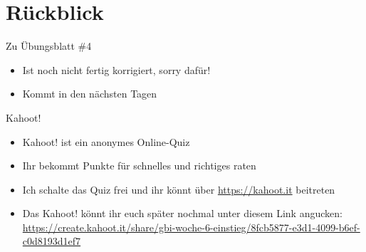 
\newcommand{\handout}{}



\morescalingdelimiters



\section{Rückblick}

\begin{frame}{Zu Übungsblatt \#4}
	\begin{itemize}[<+->]
		\item Ist noch nicht fertig korrigiert, sorry dafür!
		\item Kommt in den nächsten Tagen
	\end{itemize}
\end{frame}



 \framePrevEpisode

\begin{frame}{Kahoot!}
	\begin{itemize}[<+->]
		\item Kahoot! ist ein anonymes Online-Quiz
		\item Ihr bekommt Punkte für schnelles und richtiges raten
		\item Ich schalte das Quiz frei und ihr könnt über \url{https://kahoot.it} beitreten
		\item Das Kahoot! könnt ihr euch später nochmal unter diesem Link angucken: \\
			\url{https://create.kahoot.it/share/gbi-woche-6-einstieg/8fcb5877-e3d1-4099-b6ef-c0d8193d1ef7}
	\end{itemize}
\end{frame}

